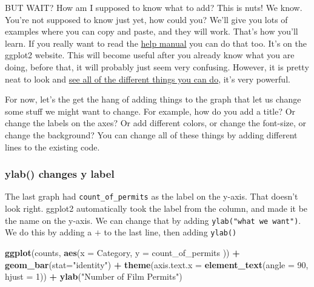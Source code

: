 \documentclass[
]{book}
\newenvironment{Shaded}{\begin{snugshade}}{\end{snugshade}}
\newcommand{\AttributeTok}[1]{\textcolor[rgb]{0.13,0.29,0.53}{#1}}
\newcommand{\DecValTok}[1]{\textcolor[rgb]{0.00,0.00,0.81}{#1}}
\newcommand{\FunctionTok}[1]{\textcolor[rgb]{0.13,0.29,0.53}{\textbf{#1}}}
\newcommand{\NormalTok}[1]{#1}
\newcommand{\SpecialCharTok}[1]{\textcolor[rgb]{0.81,0.36,0.00}{\textbf{#1}}}
\newcommand{\StringTok}[1]{\textcolor[rgb]{0.31,0.60,0.02}{#1}}
\begin{document}
BUT WAIT? How am I supposed to know what to add? This is nuts! We know. You're not supposed to know just yet, how could you? We'll give you lots of examples where you can copy and paste, and they will work. That's how you'll learn. If you really want to read the \href{https://ggplot2.tidyverse.org/reference/index.html}{help manual} you can do that too. It's on the ggplot2 website. This will become useful after you already know what you are doing, before that, it will probably just seem very confusing. However, it is pretty neat to look and \href{http://www.ggplot2-exts.org/gallery/}{see all of the different things you can do}, it's very powerful.

For now, let's the get the hang of adding things to the graph that let us change some stuff we might want to change. For example, how do you add a title? Or change the labels on the axes? Or add different colors, or change the font-size, or change the background? You can change all of these things by adding different lines to the existing code.

\hypertarget{ylab-changes-y-label}{%
\subsubsection{ylab() changes y label}\label{ylab-changes-y-label}}

The last graph had \texttt{count\_of\_permits} as the label on the y-axis. That doesn't look right. ggplot2 automatically took the label from the column, and made it be the name on the y-axis. We can change that by adding \texttt{ylab("what\ we\ want")}. We do this by adding a \(+\) to the last line, then adding \texttt{ylab()}

\begin{Shaded}
\begin{Highlighting}[]
\FunctionTok{ggplot}\NormalTok{(counts, }\FunctionTok{aes}\NormalTok{(}\AttributeTok{x =}\NormalTok{ Category, }\AttributeTok{y =}\NormalTok{ count\_of\_permits )) }\SpecialCharTok{+}
  \FunctionTok{geom\_bar}\NormalTok{(}\AttributeTok{stat=}\StringTok{"identity"}\NormalTok{) }\SpecialCharTok{+} 
  \FunctionTok{theme}\NormalTok{(}\AttributeTok{axis.text.x =} \FunctionTok{element\_text}\NormalTok{(}\AttributeTok{angle =} \DecValTok{90}\NormalTok{, }\AttributeTok{hjust =} \DecValTok{1}\NormalTok{)) }\SpecialCharTok{+}
  \FunctionTok{ylab}\NormalTok{(}\StringTok{"Number of Film Permits"}\NormalTok{)}
\end{Highlighting}
\end{Shaded}
\end{document}
